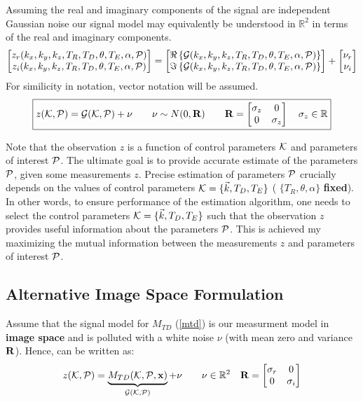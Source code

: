\documentclass{article}         %
\theoremstyle{definition}
\theoremstyle{remark}
\newcommand{\eqn}[1]{(\ref{#1})}
\begin{document}
Assuming the real and imaginary components of the signal are independent Gaussian noise our 
signal model may equivalently be understood in $\mathbb{R}^2$ in terms of the real
and imaginary components.
\[
\begin{bmatrix}
z_r(k_x,k_y,k_z,T_R,T_D,\theta,T_E,\alpha,\mathcal{P}) \\
z_i(k_x,k_y,k_z,T_R,T_D,\theta,T_E,\alpha,\mathcal{P}) \\
\end{bmatrix}
= 
\begin{bmatrix}
\Re \left\{ \mathcal{G}(k_x,k_y,k_z,T_R,T_D,\theta,T_E,\alpha,\mathcal{P})  \right\} \\
\Im \left\{ \mathcal{G}(k_x,k_y,k_z,T_R,T_D,\theta,T_E,\alpha,\mathcal{P})  \right\} \\
\end{bmatrix}
 + 
\begin{bmatrix}
\nu_r \\
\nu_i \\
\end{bmatrix}
\]
For similicity in notation, vector notation will be assumed.
\[\boxed{
z(\mathcal{K},\mathcal{P}) = \mathcal{G}(\mathcal{K},\mathcal{P}) + \nu
\qquad
\nu \sim N(0,\mathbf{R})
\qquad
\mathbf{R} = 
\begin{bmatrix}
\sigma_z &      0    \\
    0    & \sigma_z  \\
\end{bmatrix}
\quad
\sigma_z \in \mathbb{R}
}
\]

Note that the observation $z$ is a function of control parameters $\mathcal{K}$ and
parameters of interest $\mathcal{P}$.  The ultimate goal is to provide accurate estimate
of the parameters $\mathcal{P}$, given some measurements $z$. 
Precise estimation of parameters $\mathcal{P}$ crucially depends on the values of
control parameters $\mathcal{K}=\{\vec{k},T_D,T_E\}$ ( $\{T_R,\theta,\alpha\}$ \textbf{fixed}).  
In other words, to ensure
performance of the estimation algorithm, one needs to select the control
parameters $\mathcal{K}=\{\vec{k},T_D,T_E\}$ such that the observation $z$ provides
useful information about the parameters $\mathcal{P}$. This is achieved my maximizing
the mutual information between the measurements $z$ and parameters of interest
$\mathcal{P}$. 


\subsection{Alternative Image Space Formulation}
Assume that the signal model  for $M_{TD}$ \eqn{mtd} is our measurment model in \textbf{image space}
and is polluted with a white noise $\nu$ (with mean zero and variance $\mathbf{R}$). Hence,  can be written as:
\begin{equation}\label{mtdobs}
z(\mathcal{K},\mathcal{P})=\underbrace{M_{TD}(\mathcal{K},\mathcal{P},\mathbf{x})}_{\mathcal{G}(\mathcal{K},\mathcal{P})}+\nu
\qquad
\nu \in \mathbb{R}^2
\quad 
\mathbf{R} = 
\begin{bmatrix}
\sigma_r &      0    \\
    0    & \sigma_i  \\
\end{bmatrix}
\end{equation}
\end{document}

